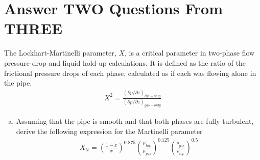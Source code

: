\documentclass[calculator,datasheet,handbook]{exam}
\begin{document}
\part{Answer TWO Questions From THREE}

\begin{question}
  The Lockhart-Martinelli parameter, $X$, is a critical parameter in
  two-phase flow pressure-drop and liquid hold-up calculations. It is
  defined as the ratio of the frictional pressure drops of each phase,
  calculated as if each was flowing alone in the pipe.
  \begin{align*}
    X^2=\frac{\left(\partial p/\partial
        z\right)_{liq.-only}}{\left(\partial p/\partial
        z\right)_{gas-only}}
  \end{align*}
  \begin{enumerate}[a)]
  \item Assuming that the pipe is smooth and that both phases are
    fully turbulent, derive the following expression for the
    Martinelli parameter
    \begin{align*}
      X_{tt}=\left(\frac{1-x}{x}\right)^{0.875}
      \left(\frac{\mu_{liq.}}{\mu_{gas}}\right)^{0.125} 
      \left(\frac{\rho_{gas}}{\rho_{liq.}}\right)^{0.5}
    \end{align*}
     
\end{enumerate}
\end{question}
\end{document}
